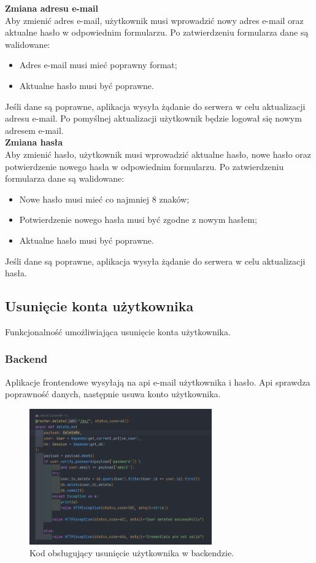 \textbf{Zmiana adresu e-mail}\\
Aby zmienić adres e-mail, użytkownik musi wprowadzić nowy adres e-mail oraz aktualne hasło w odpowiednim formularzu. Po zatwierdzeniu formularza dane są walidowane:
\begin{itemize}
    \item Adres e-mail musi mieć poprawny format;
    \item Aktualne hasło musi być poprawne.
\end{itemize}
Jeśli dane są poprawne, aplikacja wysyła żądanie do serwera w celu aktualizacji adresu e-mail. Po pomyślnej aktualizacji użytkownik będzie logował się nowym adresem e-mail.\\


\textbf{Zmiana hasła}\\
Aby zmienić hasło, użytkownik musi wprowadzić aktualne hasło, nowe hasło oraz potwierdzenie nowego hasła w odpowiednim formularzu. Po zatwierdzeniu formularza dane są walidowane:
\begin{itemize}
    \item Nowe hasło musi mieć co najmniej 8 znaków;
    \item Potwierdzenie nowego hasła musi być zgodne z nowym hasłem;
    \item Aktualne hasło musi być poprawne.
\end{itemize}
Jeśli dane są poprawne, aplikacja wysyła żądanie do serwera w celu aktualizacji hasła.

\subsection{Usunięcie konta użytkownika}
Funkcjonalność umożliwiająca usunięcie konta użytkownika.

\subsubsection{Backend}
Aplikacje frontendowe wysyłają na api e-mail użytkownika i hasło. Api sprawdza poprawność danych, następnie usuwa konto użytkownika.

\begin{figure}[H]
    \centering
    \includegraphics[width=0.7\textwidth]{chapters/chapter_8/screens/delete_user_backend}
    \caption{Kod obsługujący usunięcie użytkownika w backendzie.}
    \label{img:delete_user_backend}
\end{figure}


